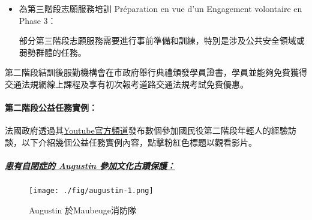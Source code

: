 \documentclass[a4paper,14pt]{extarticle}
\theoremstyle{plain}
\theoremstyle{remark}
\numberwithin{equation}{section}
\begin{document}
\begin{itemize}


	\item 為第三階段志願服務培訓 Préparation en vue d'un Engagement volontaire en Phase 3：

    部分第三階段志願服務需要進行事前準備和訓練，特別是涉及公共安全領域或弱勢群體的任務。

\end{itemize}


第二階段結訓後服勤機構會在市政府舉行典禮頒發學員證書，學員並能夠免費獲得交通法規網線上課程及享有初次報考道路交通法規考試免費優惠\cite{info-jeunes-snu}。

\paragraph{第二階段公益任務實例：}

法國政府透過其\href{https://www.youtube.com/@gouvernementfr}{Youtube官方頻道}發布數個參加國民役第二階段年輕人的經驗訪談，以下介紹幾個公益任務實例內容，點擊粉紅色標題以觀看影片。

\subparagraph{\href{https://www.youtube.com/watch?v=rsCuBOxb814}{患有自閉症的 Augustin 參加文化古蹟保護：}}
		\begin{figure}[H]
		\centering
		\texttt{[image: ./fig/augustin-1.png]}
    \caption{Augustin 於Maubeuge消防隊}
		\end{figure}
\end{document}
